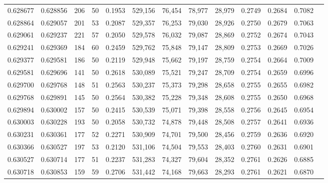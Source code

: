 \begin{tabular}{rrrrrrrrrrrrr}
0.628677 & 0.628856 &   206 &  50 &                                     0.1953 & 529,156 &  76,454 &  78,977 &  28,979 & 0.2749 & 0.2684 & 0.7082 \\
0.628864 & 0.629057 &   201 &  53 &                                     0.2087 & 529,357 &  76,253 &  79,030 &  28,926 & 0.2750 & 0.2679 & 0.7063 \\
0.629061 & 0.629237 &   221 &  57 &                                     0.2050 & 529,578 &  76,032 &  79,087 &  28,869 & 0.2752 & 0.2674 & 0.7043 \\
0.629241 & 0.629369 &   184 &  60 &                                     0.2459 & 529,762 &  75,848 &  79,147 &  28,809 & 0.2753 & 0.2669 & 0.7026 \\
0.629377 & 0.629581 &   186 &  50 &                                     0.2119 & 529,948 &  75,662 &  79,197 &  28,759 & 0.2754 & 0.2664 & 0.7009 \\
0.629581 & 0.629696 &   141 &  50 &                                     0.2618 & 530,089 &  75,521 &  79,247 &  28,709 & 0.2754 & 0.2659 & 0.6996 \\
0.629700 & 0.629768 &   148 &  51 &                                     0.2563 & 530,237 &  75,373 &  79,298 &  28,658 & 0.2755 & 0.2655 & 0.6982 \\
0.629768 & 0.629891 &   145 &  50 &                                     0.2564 & 530,382 &  75,228 &  79,348 &  28,608 & 0.2755 & 0.2650 & 0.6968 \\
0.629894 & 0.630002 &   157 &  50 &                                     0.2415 & 530,539 &  75,071 &  79,398 &  28,558 & 0.2756 & 0.2645 & 0.6954 \\
0.630003 & 0.630228 &   193 &  50 &                                     0.2058 & 530,732 &  74,878 &  79,448 &  28,508 & 0.2757 & 0.2641 & 0.6936 \\
0.630231 & 0.630361 &   177 &  52 &                                     0.2271 & 530,909 &  74,701 &  79,500 &  28,456 & 0.2759 & 0.2636 & 0.6920 \\
0.630366 & 0.630527 &   197 &  53 &                                     0.2120 & 531,106 &  74,504 &  79,553 &  28,403 & 0.2760 & 0.2631 & 0.6901 \\
0.630527 & 0.630714 &   177 &  51 &                                     0.2237 & 531,283 &  74,327 &  79,604 &  28,352 & 0.2761 & 0.2626 & 0.6885 \\
0.630718 & 0.630853 &   159 &  59 &                                     0.2706 & 531,442 &  74,168 &  79,663 &  28,293 & 0.2761 & 0.2621 & 0.6870 \\

\end{tabular}
